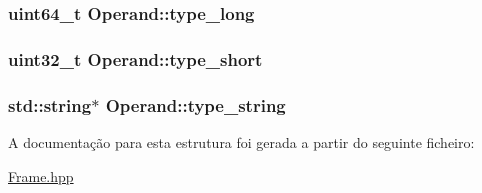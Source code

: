 \subsubsection[{\texorpdfstring{type\+\_\+long}{type_long}}]{\setlength{\rightskip}{0pt plus 5cm}uint64\+\_\+t Operand\+::type\+\_\+long}\hypertarget{struct_operand_acba3d813258f86827e414fb6e6fb6963}{}\label{struct_operand_acba3d813258f86827e414fb6e6fb6963}
\subsubsection[{\texorpdfstring{type\+\_\+short}{type_short}}]{\setlength{\rightskip}{0pt plus 5cm}uint32\+\_\+t Operand\+::type\+\_\+short}\hypertarget{struct_operand_a9a95367e26a5d3016da0b6d9fc9f0359}{}\label{struct_operand_a9a95367e26a5d3016da0b6d9fc9f0359}
\subsubsection[{\texorpdfstring{type\+\_\+string}{type_string}}]{\setlength{\rightskip}{0pt plus 5cm}std\+::string$\ast$ Operand\+::type\+\_\+string}\hypertarget{struct_operand_ab339ad43cfc3f1c32be042769846f049}{}\label{struct_operand_ab339ad43cfc3f1c32be042769846f049}


A documentação para esta estrutura foi gerada a partir do seguinte ficheiro\+:\begin{DoxyCompactItemize}
\item 
\hyperlink{_frame_8hpp}{Frame.\+hpp}\end{DoxyCompactItemize}
